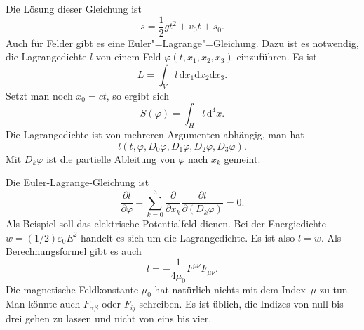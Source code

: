 \documentclass[a4paper,11pt,fleqn,twocolumn,twoside]{scrartcl}
\numberwithin{equation}{section}
\begin{document}
Die Lösung dieser Gleichung ist
\begin{equation}
s=\frac{1}{2}gt^2+v_0t+s_0.
\end{equation}
%
Auch für Felder gibt es eine Euler"=Lagrange"=Gleichung. Dazu ist es
notwendig, die Lagrangedichte $l$ von einem Feld
$\varphi(t,x_1,x_2,x_3)$ einzuführen. Es ist
\begin{equation}
L = \int_V l\,\mathrm dx_1\mathrm dx_2\mathrm dx_3.
\end{equation}
Setzt man noch $x_0=ct$, so ergibt sich
\begin{equation}
S(\varphi) = \int_H l\,\mathrm d^4x.
\end{equation}
Die Lagrangedichte ist von mehreren Argumenten abhängig, man hat
\begin{equation}
l(t,\varphi,D_0\varphi, D_1\varphi, D_2\varphi, D_3\varphi).
\end{equation}
Mit $D_k\varphi$ ist die partielle Ableitung von $\varphi$
nach $x_k$ gemeint.

Die Euler-Lagrange-Gleichung ist
\begin{equation}
\frac{\partial l}{\partial\varphi}
- \sum_{k=0}^3 \frac{\partial}{\partial x_k}
\frac{\partial l}{\partial (D_k\varphi)}=0.
\end{equation}
Als Beispiel soll das elektrische Potentialfeld dienen.
Bei der Energiedichte $w=(1/2)\varepsilon_0 E^2$ handelt es sich
um die Lagrangedichte. Es ist also $l=w$.
Als Berechnungsformel gibt es auch
\begin{equation}
l = -\frac{1}{4\mu_0} F^{\mu\nu}F_{\mu\nu}.
\end{equation}
Die magnetische Feldkonstante $\mu_0$ hat natürlich nichts
mit dem Index~$\mu$ zu tun. Man könnte auch $F_{\alpha\beta}$
oder $F_{ij}$ schreiben. Es ist üblich, die Indizes von null bis
drei gehen zu lassen und nicht von eins bis vier.
\end{document}
